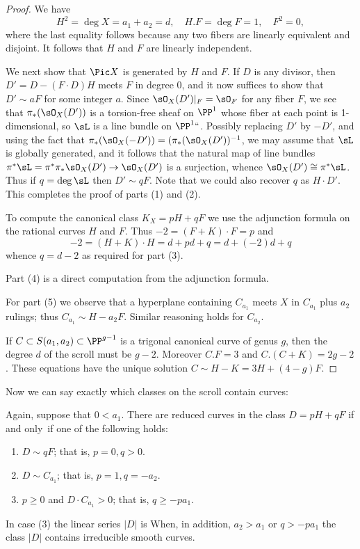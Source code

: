 \begin{proof}
We have
$$
H^2 = \deg X = a_1+a_2 = d, \quad H.F = \deg F = 1, \quad F^2 = 0,
$$
where the last equality follows because any two fibers are linearly
equivalent and disjoint.
It follows 
that $H$ and $F$ are linearly independent.

We next show that $\Pic X$ is generated by $H$ and $F$. If $D$ is any
divisor,
then $D' = D - (F\cdot D)H$ meets $F$ in degree 0, and it now suffices
to show that $D'\sim aF$ for
some integer $a$.
Since $\sO_X(D')|_F = \sO_F$ for any fiber $F$, we see that
$\pi_*(\sO_X(D'))$ is a torsion-free sheaf on $\PP^1$ whose fiber at
each point is 1-dimensional,
so $\sL$ is a line bundle on $\PP^1` `$.  Possibly replacing $D'$ by
$-D'$, and using the fact that
$\pi_*(\sO_X(-D')) = (\pi_*(\sO_X(D'))^{-1}$, we may assume that $\sL$ is
globally generated, and it follows that  the natural map of line bundles
$\pi^*\sL = \pi^*\pi_* \sO_X(D') \to \sO_X(D') $ is a surjection, whence
$\sO_X(D') \cong \pi^*\sL$. Thus if $q = \deg \sL$ then
$D' \sim qF$. Note that we could also recover $q$ as $H\cdot D'$. This
completes the proof of parts
(1) and (2).

To compute the canonical class $K_X = pH+qF$ we use the adjunction
formula on the rational curves
$H$ and $F$. Thus $-2 = (F+K)\cdot F = p $ and
$$
-2 = (H+K)\cdot H = d + pd+q = d + (-2)d+q
$$
whence $q = d-2$ as required for part (3).

Part (4) is a direct computation from the adjunction formula.

For part (5) we observe that a hyperplane containing $C_{a_1}$ meets $X$
in $C_{a_1}$ plus
$a_2$ rulings; thus $C_{a_1}\sim H-a_2F$. Similar reasoning holds for
$C_{a_{2}}$.

If  $C \subset S(a_{1}, a_{2}) \subset \PP^{g-1}$ is a	trigonal canonical
curve of genus $g$, then the degree
$d$ of the scroll must be $g-2$. Moreover $C.F=3$ and $C.(C+K) =
2g-2$. These equations have the unique solution
$C \sim H-K = 3H + (4-g)F.$
\end{proof}

Now we can say exactly which classes on the scroll contain curves:

\begin{theorem}\label{where are the curves?} Again, suppose that
$0<a_{1}$.
There are reduced  curves in the class $D = pH+qF$ if and only~if one
of the following holds:

\begin{enumerate}
\item $D\sim qF$; that is, $p=0, q>0$.
\item $D\sim C_{a_{1}}$; that is, $p=1, q=-a_{2}$.
\item $p\geq 0$ and $D\cdot C_{a_{1}}> 0$; that is, $q \geq -pa_1$.
\end{enumerate}
In case (3) the linear series $|D|$ is 
%
When, in addition,
$a_2>a_1$ or $q>-pa_1$ the class $|D|$ contains irreducible smooth curves.
\unif
\end{theorem}

